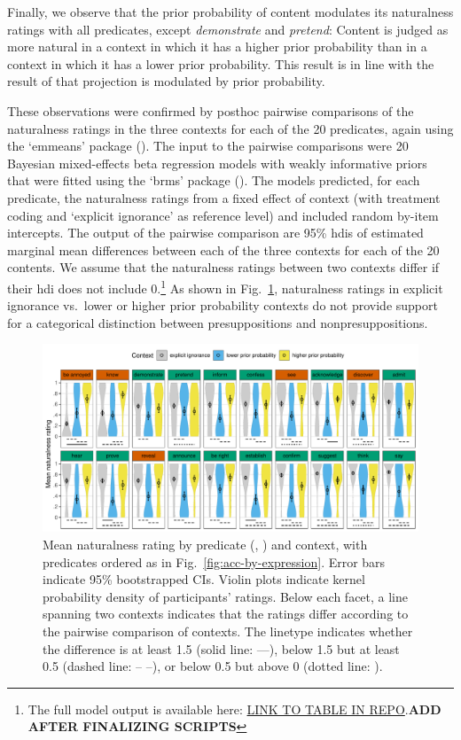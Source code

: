 \documentclass[11pt,fleqn]{article}
\newcommand{\6}{\mbox{$[\hspace*{-.6mm}[$}}
\newcommand{\9}{\mbox{$]\hspace*{-.6mm}]$}}
\begin{document}
Finally, we observe that the prior probability of content modulates its naturalness ratings with all predicates, except {\em demonstrate} and {\em pretend}: Content is judged as more natural in a context in which it has a higher prior probability than in a context in which it has a lower prior probability. This result is in line with the result of \citealt{degen-tonhauser-openmind} that projection is modulated by prior probability.

These observations were confirmed by posthoc pairwise comparisons of the naturalness ratings in the three contexts for each of the 20 predicates, again using the `emmeans' package (\citealt{emmeans}). The input to the pairwise comparisons were 20 Bayesian mixed-effects beta regression models with weakly informative priors that were fitted using the `brms' package (\citealt{buerkner2017}). The models predicted, for each predicate, the naturalness ratings from a fixed effect of context (with treatment coding and `explicit ignorance' as reference level) and included random by-item intercepts. The output of the pairwise comparison are 95\% hdis of estimated marginal mean differences between each of the three contexts for each of the 20 contents. We assume that the naturalness ratings between two contexts differ if their hdi does not include 0.\footnote{The full model output is available here: \url{LINK TO TABLE IN REPO}.{\bf ADD AFTER FINALIZING SCRIPTS}} As shown in Fig.~\ref{fig:acc-by-context}, naturalness ratings in explicit ignorance vs.\ lower or higher prior probability contexts do not provide support for a categorical distinction between presuppositions and nonpresuppositions.

\begin{figure}[h!]
\centering
\includegraphics[width=\textwidth]{../../results/main/graphs/naturalness-by-context-and-predicate-with-stats}
\caption{Mean naturalness rating by predicate (, ) and context, with predicates ordered as in Fig.~\ref{fig:acc-by-expression}. Error bars indicate 95\% bootstrapped CIs. Violin plots indicate kernel probability density of participants' ratings. Below each facet, a line spanning two contexts  indicates that the ratings differ according to the pairwise comparison of contexts. The linetype indicates  whether the difference is at least 1.5 (solid line: ---), below 1.5 but at least 0.5 (dashed line: -- --), or below 0.5 but above 0 (dotted line: \raisebox{1mm}{\ldots}). }\label{fig:acc-by-context}
\end{figure}
\end{document}
